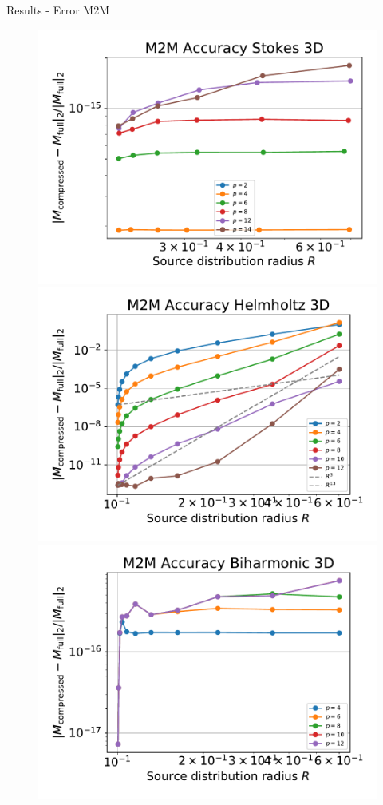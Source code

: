 \documentclass[10pt,usenames,dvipsnames]{beamer}
\begin{document}
\begin{frame}[fragile]{Results - Error M2M}
\begin{figure}
\includegraphics[scale=0.3]{figures/accuracy-stokes-3d.pdf}
\includegraphics[scale=0.3]{figures/accuracy-helmholtz-3d.pdf}
\includegraphics[scale=0.3]{figures/accuracy-biharmonic-3d.pdf}

\end{figure}
\end{frame}
\end{document}
